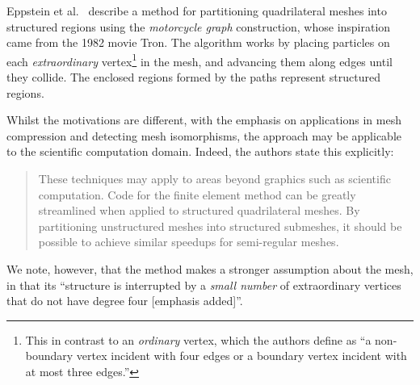 


Eppstein et al.~\cite{eppstein2008motorcycle} describe a method for partitioning quadrilateral meshes into structured regions using the \emph{motorcycle graph} construction, whose inspiration came from the 1982 movie Tron. The algorithm works by placing particles on each \emph{extraordinary} vertex\footnote{This in contrast to an \emph{ordinary} vertex, which the authors define as ``a non-boundary vertex incident with four edges or a boundary vertex incident with at most three edges.''} in the mesh, and advancing them along edges until they collide. The enclosed regions formed by the paths represent structured regions.

Whilst the motivations are different, with the emphasis on applications in mesh compression and detecting mesh isomorphisms, the approach may be applicable to the scientific computation domain. Indeed, the authors state this explicitly:
\begin{quote}
These techniques may apply to areas beyond graphics such as scientific computation. Code for the finite element method can be greatly streamlined when applied to structured quadrilateral meshes. By partitioning unstructured meshes into structured submeshes, it should be possible to achieve similar speedups for semi-regular meshes.
\end{quote}

We note, however, that the method makes a stronger assumption about the mesh, in that its ``structure is interrupted by a \emph{small number} of extraordinary vertices that do not have degree four [emphasis added]''.



